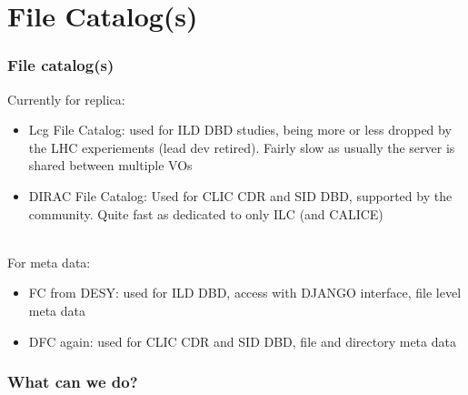 \documentclass[10pt,table,dvipsnames]{beamer}
\begin{document}
\section{File Catalog(s)}
\label{sec:fc}

\begin{frame}
  \frametitle{File catalog(s)}
Currently for replica:
\begin{itemize}
\item Lcg File Catalog: used for ILD DBD studies, being more or less
  dropped by the LHC experiements (lead dev retired). Fairly slow as
  usually the server is shared between multiple VOs
\item DIRAC File Catalog: Used for CLIC CDR and SID DBD, supported by
  the community. Quite fast as dedicated to only ILC (and CALICE)
\end{itemize}
~\\
For meta data:
\begin{itemize}
\item FC from DESY: used for ILD DBD, access with DJANGO interface,
  file level meta data
\item DFC again: used for CLIC CDR and SID DBD, file and directory
  meta data
\end{itemize}

\end{frame}

\begin{frame}
  \frametitle{What can we do?}
\centering
  \\
\end{frame}
\end{document}
